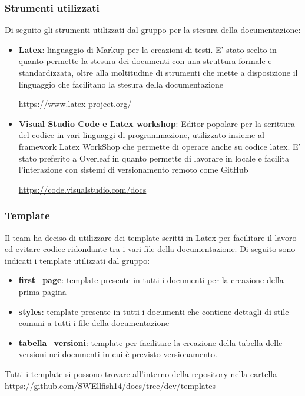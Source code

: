 \documentclass[12pt]{article}
\begin{document}
\subsubsection{Strumenti utilizzati}
Di seguito gli strumenti utilizzati dal gruppo per la stesura della documentazione:
\begin{itemize}
    \item \textbf{Latex}: linguaggio di Markup per la creazioni di testi. E' stato scelto in quanto permette la stesura dei documenti con una struttura formale e standardizzata, oltre alla moltitudine di strumenti che mette a disposizione il linguaggio che facilitano la stesura della documentazione
          \begin{center}
              \url{https://www.latex-project.org/}
          \end{center}
    \item \textbf{Visual Studio Code e Latex workshop}: Editor popolare per la scrittura del codice in vari linguaggi di programmazione, utilizzato insieme al framework Latex WorkShop che permette di operare anche su codice latex. E' stato preferito a Overleaf in quanto permette di lavorare in locale e facilita l'interazione con sistemi di versionamento remoto come GitHub
          \begin{center}
              \url{https://code.visualstudio.com/docs}
          \end{center}
\end{itemize}


\subsubsection{Template}
Il team ha deciso di utilizzare dei template scritti in Latex per facilitare il lavoro ed evitare codice ridondante tra i vari file della documentazione.
Di seguito sono indicati i template utilizzati dal gruppo:
\begin{itemize}
    \item \textbf{first\_page}: template presente in tutti i documenti per la creazione della prima pagina
    \item \textbf{styles}: template presente in tutti i documenti che contiene dettagli di stile comuni a tutti i file della documentazione
    \item \textbf{tabella\_versioni}: template per facilitare la creazione della tabella delle versioni nei documenti in cui è previsto versionamento.

\end{itemize}
Tutti i template si possono trovare all'interno della repository nella cartella \url{https://github.com/SWEllfish14/docs/tree/dev/templates}
\end{document}
